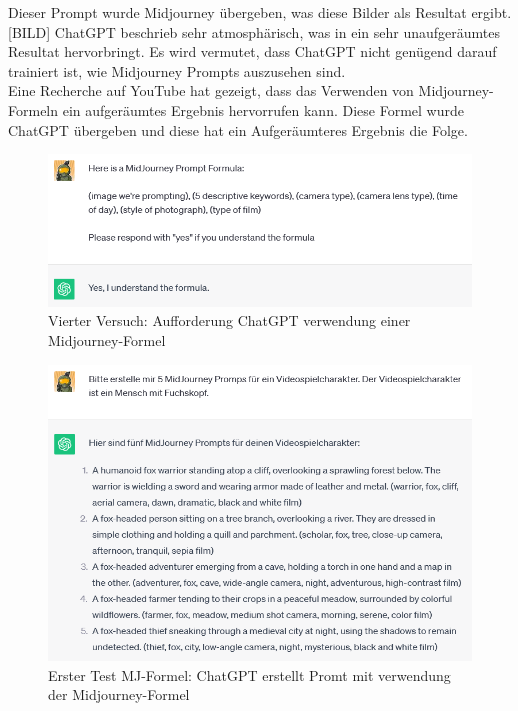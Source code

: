 \documentclass[10pt,a4paper,bibliography=totocnumbered,listof=totocnumbered]{scrartcl}
\begin{document}
Dieser Prompt wurde Midjourney übergeben, was diese Bilder als Resultat ergibt.
[BILD]
ChatGPT beschrieb sehr atmosphärisch, was in ein sehr unaufgeräumtes Resultat hervorbringt.
Es wird vermutet, dass ChatGPT nicht genügend darauf trainiert ist, wie Midjourney Prompts auszusehen sind.
\\
Eine Recherche auf YouTube hat gezeigt, dass das Verwenden von Midjourney-Formeln ein aufgeräumtes Ergebnis hervorrufen kann. Diese Formel wurde ChatGPT übergeben und diese hat ein Aufgeräumteres Ergebnis die Folge.
\begin{figure}[h]
	\centering
	\includegraphics[width=14cm]{BilderFuerBA/CGPTMidJourneyMartinLuther/04.png}
	\caption{Vierter Versuch: Aufforderung ChatGPT verwendung einer Midjourney-Formel}
	\label{fig:chatgpt-ptompt-Midjourney-04}
\end{figure}
\begin{figure}[h]
	\centering
	\includegraphics[width=14cm]{BilderFuerBA/CGPTMidJourneyMartinLuther/05.png}
	\caption{Erster Test MJ-Formel: ChatGPT erstellt Promt mit verwendung der Midjourney-Formel}
	\label{fig:chatgpt-ptompt-Midjourney-05}
\end{figure}
\end{document}
